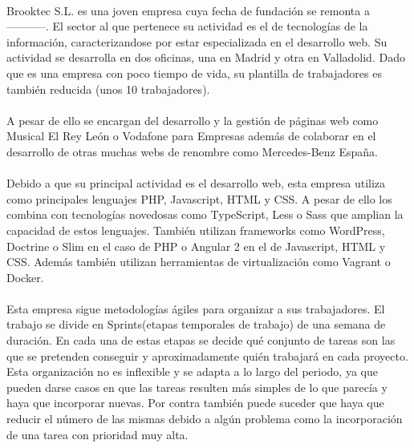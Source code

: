 \documentclass[11pt, a4paper,spanish]{article}
\begin{document}
        \paragraph{}
        Brooktec S.L. es una joven empresa cuya fecha de fundación se remonta a -----------. El sector al que pertenece su actividad es el de tecnologías de la información, caracterizandose por estar especializada en el desarrollo web. Su actividad se desarrolla en dos oficinas, una en Madrid y otra en Valladolid. Dado que es una empresa con poco tiempo de vida, su plantilla de trabajadores es también reducida (unos 10 trabajadores).

        \paragraph{}
        A pesar de ello se encargan del desarrollo y la gestión de páginas web como Musical El Rey León o Vodafone para Empresas además de colaborar en el desarrollo de otras muchas webs de renombre como Mercedes-Benz España.

        \paragraph{}
        Debido a que su principal actividad es el desarrollo web, esta empresa utiliza como principales lenguajes PHP, Javascript, HTML y CSS. A pesar de ello los combina con tecnologías novedosas como TypeScript, Less o Sass que amplian la capacidad de estos lenguajes. También utilizan frameworks como WordPress, Doctrine o Slim en el caso de PHP o Angular 2 en el de Javascript, HTML y CSS. Además también utilizan herramientas de virtualización como Vagrant o Docker.

        \paragraph{}
        Esta empresa sigue metodologías ágiles para organizar a sus trabajadores. El trabajo se divide en Sprints(etapas temporales de trabajo) de una semana de duración. En cada una de estas etapas se decide qué conjunto de tareas son las que se pretenden conseguir y aproximadamente quién trabajará en cada proyecto. Esta organización no es inflexible y se adapta a lo largo del periodo, ya que pueden darse casos en que las tareas resulten más simples de lo que parecía y haya que incorporar nuevas. Por contra también puede suceder que haya que reducir el número de las mismas debido a algún problema como la incorporación de una tarea con prioridad muy alta.
\end{document}

